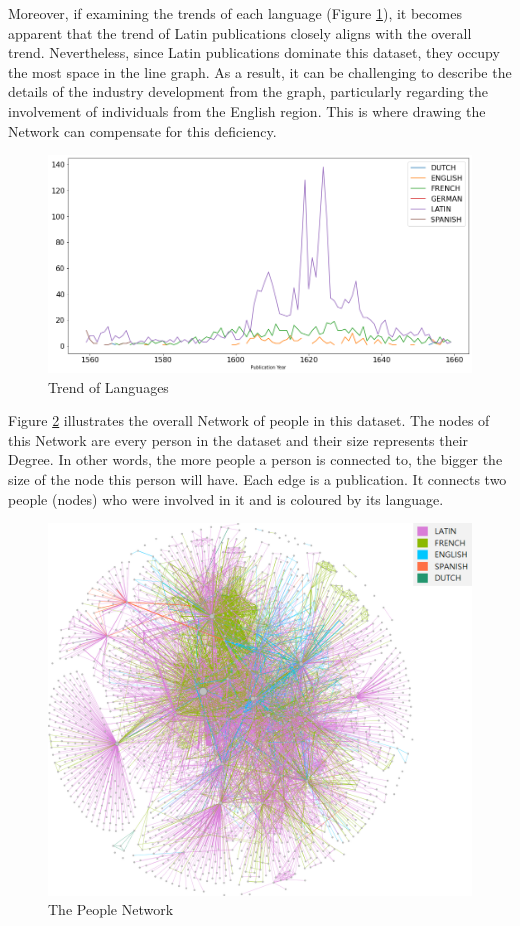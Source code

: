 \documentclass[12pt,a4paper,oneside]{book}
\begin{document}
\begin{sloppypar}
Moreover, if examining the trends of each language (Figure \ref{fig:lanTrend}), it becomes apparent that the trend of Latin publications closely aligns with the overall trend. Nevertheless, since Latin publications dominate this dataset, they occupy the most space in the line graph. As a result, it can be challenging to describe the details of the industry development from the graph, particularly regarding the involvement of individuals from the English region. This is where drawing the Network can compensate for this deficiency.

\begin{figure}[H]
\centering
\includegraphics[scale=0.4]{graph/Trend of Languages.png}
\caption{Trend of Languages}
\label{fig:lanTrend}
\end{figure}

\pagebreak
Figure \ref{fig:peoNet} illustrates the overall Network of people in this dataset. The nodes of this Network are every person in the dataset and their size represents their Degree. In other words, the more people a person is connected to, the bigger the size of the node this person will have. Each edge is a publication. It connects two people (nodes) who were involved in it and is coloured by its language.

\begin{figure}[H]
\centering
\includegraphics[scale=0.6]{graph/The People Network.png}
\caption{The People Network}
\label{fig:peoNet}
\end{figure}


\end{sloppypar}
\end{document}
